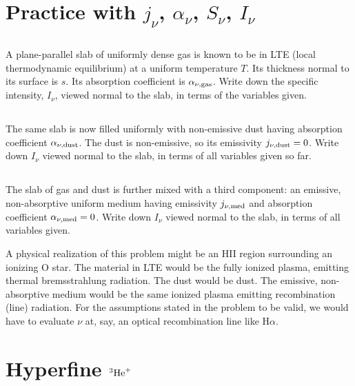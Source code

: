 \documentclass[11pt]{article}
\begin{document}
\section{Practice with $j_\nu$, $\alpha_\nu$, $S_\nu$, $I_\nu$}

\subsection{}

A plane-parallel slab of uniformly dense gas is known to be in LTE (local
thermodynamic equilibrium) at a uniform temperature $T$. Its thickness normal
to its surface is $s$. Its absorption coefficient is $\alpha_{\nu,{\rm gas}}$. 
Write down the
specific intensity, $I_\nu$, viewed normal to the slab, in terms of the variables
given.

\subsection{}

The same slab is now filled uniformly with non-emissive dust having absorption
coefficient $\alpha_{\nu,{\rm dust}}$. The dust is non-emissive, so its emissivity 
$j_{\nu,{\rm dust}}=0$.
Write down $I_\nu$ viewed normal to the slab, in terms of all variables given so
far.

\subsection{}

The slab of gas and dust is further mixed with a third component: an emissive,
non-absorptive uniform medium having emissivity $j_{\nu,{\rm med}}$ and
absorption coefficient $\alpha_{\nu,{\rm med}}=0$. Write down $I_\nu$ viewed
normal to the slab, in terms of all variables given.

A physical realization of this problem might be an HII region surrounding an
ionizing O star. The material in LTE would be the fully ionized plasma,
emitting thermal bremsstrahlung radiation. The dust would be dust. The
emissive, non-absorptive medium would be the same ionized plasma emitting
recombination (line) radiation. For the assumptions stated in the problem to be
valid, we would have to evaluate $\nu$ at, say, an optical recombination line
like H$\alpha$.

\def\He{{^3{\rm He}^+}}
\section{Hyperfine $\He$}
\end{document}
